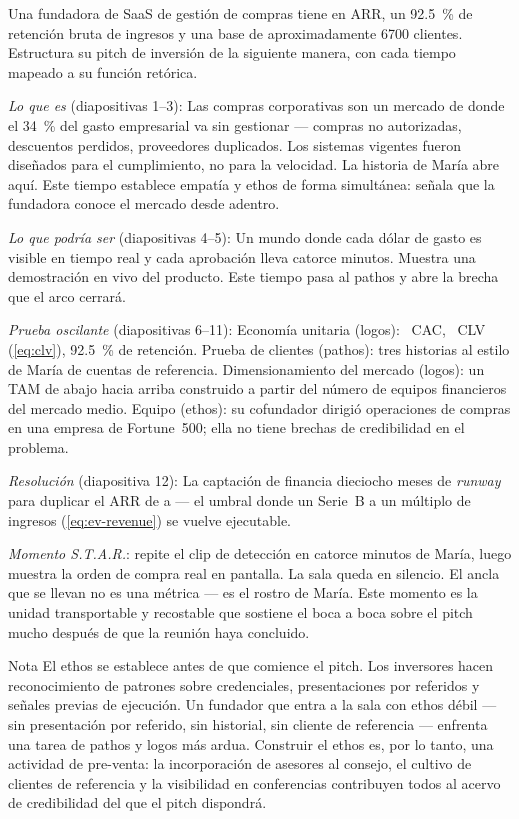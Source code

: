 \begin{example}
Una fundadora de SaaS de gestión de compras tiene  en ARR, un \qty{92.5}{\percent}
de retención bruta de ingresos y una base de aproximadamente \num{6700} clientes. Estructura
su pitch de inversión de la siguiente manera, con cada tiempo mapeado a su función retórica.

\emph{Lo que es} (diapositivas 1–3): Las compras corporativas son un mercado de
 donde el \qty{34}{\percent} del gasto empresarial va sin gestionar —
compras no autorizadas, descuentos perdidos, proveedores duplicados. Los sistemas vigentes
fueron diseñados para el cumplimiento, no para la velocidad. La historia de María abre aquí.
Este tiempo establece empatía y ethos de forma simultánea: señala que la fundadora conoce el
mercado desde adentro.

\emph{Lo que podría ser} (diapositivas 4–5): Un mundo donde cada dólar de gasto es visible
en tiempo real y cada aprobación lleva catorce minutos. Muestra una demostración en vivo del
producto. Este tiempo pasa al pathos y abre la brecha que el arco cerrará.

\emph{Prueba oscilante} (diapositivas 6–11): Economía unitaria (logos): ~CAC,
~CLV (\cref{eq:clv}), \qty{92.5}{\percent} de retención. Prueba de clientes
(pathos): tres historias al estilo de María de cuentas de referencia. Dimensionamiento del
mercado (logos): un TAM de abajo hacia arriba construido a partir del número de equipos
financieros del mercado medio. Equipo (ethos): su cofundador dirigió operaciones de compras
en una empresa de Fortune~500; ella no tiene brechas de credibilidad en el problema.

\emph{Resolución} (diapositiva 12): La captación de  financia dieciocho meses
de \emph{runway} para duplicar el ARR de  a  — el umbral donde
un Serie~B a un múltiplo de ingresos (\cref{eq:ev-revenue}) se vuelve ejecutable.

\emph{Momento S.T.A.R.}: repite el clip de detección en catorce minutos de María, luego
muestra la orden de compra real en pantalla. La sala queda en silencio. El ancla que se llevan
no es una métrica — es el rostro de María. Este momento es la unidad transportable y recostable
que sostiene el boca a boca sobre el pitch mucho después de que la reunión haya concluido.
\end{example}

\begin{admonition}{Nota}
El ethos se establece antes de que comience el pitch. Los inversores hacen reconocimiento de
patrones sobre credenciales, presentaciones por referidos y señales previas de ejecución. Un
fundador que entra a la sala con ethos débil — sin presentación por referido, sin historial,
sin cliente de referencia — enfrenta una tarea de pathos y logos más ardua. Construir el ethos
es, por lo tanto, una actividad de pre-venta: la incorporación de asesores al consejo, el
cultivo de clientes de referencia y la visibilidad en conferencias contribuyen todos al acervo
de credibilidad del que el pitch dispondrá.
\end{admonition}

